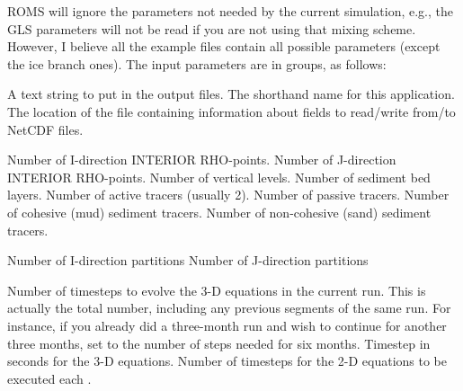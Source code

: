 ROMS will ignore the parameters not needed by the current
simulation, e.g., the GLS parameters will not be read if you are not
using that mixing scheme. However, I believe all the example files
contain all possible parameters (except the ice branch ones).
The input parameters are in groups, as follows:
\begin{klist}
     \begin{klist}
    A text string to put in the output files.
    The shorthand name for this application.
    The location of the  file
     containing information about fields to read/write from/to NetCDF
     files.
     \end{klist}
     \begin{klist}
        Number of I-direction INTERIOR RHO-points.
        Number of J-direction INTERIOR RHO-points.
        Number of vertical levels.
        Number of sediment bed layers.
        Number of active tracers (usually 2).
        Number of passive tracers.
        Number of cohesive (mud) sediment tracers.
        Number of non-cohesive (sand) sediment tracers.
     \end{klist}
     \begin{klist}
        Number of I-direction partitions
        Number of J-direction partitions
     \end{klist}
     \begin{klist}
           Number of timesteps to evolve the 3-D
       equations in the current run.  This is actually the total
     number, including any previous segments of the same run.  For
     instance, if you already did a three-month run and wish to
     continue for another three months, set  to the
     number of steps needed for six months.
               Timestep in seconds for the 3-D equations.
          Number of timesteps for the 2-D equations
     to be executed each .
     \end{klist}
     \begin{klist}
     \end{klist}
     \begin{klist}

\end{klist}
\end{klist}
